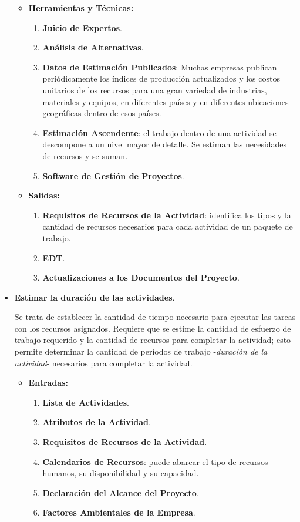 \documentclass[10pt,a4paper]{article}
\begin{document}
\begin{itemize}
\begin{itemize}
\item \textbf{Herramientas y Técnicas:}
\begin{enumerate}
\item \textbf{Juicio de Expertos}.
\item \textbf{Análisis de Alternativas}.
\item \textbf{Datos de Estimación Publicados}: Muchas empresas publican periódicamente los índices de producción actualizados y los costos unitarios de los recursos para una gran variedad de industrias, materiales y equipos, en diferentes países y en diferentes ubicaciones geográficas dentro de esos países.
\item \textbf{Estimación Ascendente}: el trabajo dentro de una actividad se descompone a un nivel mayor de detalle. Se estiman las necesidades de recursos y se suman.
\item \textbf{Software de Gestión de Proyectos}.
\end{enumerate}

\item \textbf{Salidas:}
\begin{enumerate}
\item \textbf{Requisitos de Recursos de la Actividad}: identifica los tipos y la
cantidad de recursos necesarios para cada actividad de un paquete de trabajo.
\item \textbf{EDT}.
\item \textbf{Actualizaciones a los Documentos del Proyecto}.
\end{enumerate}
\end{itemize}

\item \textbf{Estimar la duración de las actividades}. 

Se trata de establecer la cantidad de tiempo necesario para ejecutar las tareas con los recursos asignados. Requiere que se estime la cantidad de esfuerzo de trabajo requerido y la cantidad de recursos para completar la actividad; esto permite determinar la cantidad de períodos de trabajo -\textit{duración de la actividad}- necesarios para completar la actividad.

\begin{itemize}
\item \textbf{Entradas:}
\begin{enumerate}
\item \textbf{Lista de Actividades}.
\item \textbf{Atributos de la Actividad}.
\item \textbf{Requisitos de Recursos de la Actividad}.
\item \textbf{Calendarios de Recursos}: puede abarcar el tipo de recursos humanos, su disponibilidad y su capacidad. 
\item \textbf{Declaración del Alcance del Proyecto}.
\item \textbf{Factores Ambientales de la Empresa}.
\end{enumerate}


\end{itemize}
\end{itemize}
\end{document}
